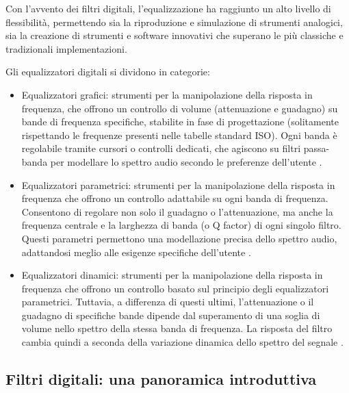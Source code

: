 \documentclass[12pt]{report}
\begin{document}
Con l’avvento dei filtri digitali, l’equalizzazione ha raggiunto un alto livello di flessibilità, permettendo sia la riproduzione e simulazione di strumenti analogici, sia la creazione di strumenti e software innovativi che superano le
più classiche e tradizionali implementazioni.

Gli equalizzatori digitali si dividono in categorie:
\begin{itemize}
    \item Equalizzatori grafici: strumenti per la manipolazione della risposta in frequenza, che offrono un controllo di volume (attenuazione e guadagno) su bande di frequenza specifiche, stabilite in fase di progettazione (solitamente rispettando le frequenze presenti nelle tabelle standard ISO). Ogni banda è regolabile tramite cursori o controlli dedicati, che agiscono su filtri passa-banda per modellare lo spettro audio secondo le preferenze dell'utente \parencite{liski2017quest}.
    \item Equalizzatori parametrici: strumenti per la manipolazione della risposta in frequenza che offrono un controllo adattabile su ogni banda di frequenza. Consentono di regolare non solo il guadagno o l'attenuazione, ma anche la frequenza centrale e la larghezza di banda (o Q factor) di ogni singolo filtro. Questi parametri permettono una modellazione precisa dello spettro audio, adattandosi meglio alle esigenze specifiche dell'utente \parencite{massenburg1972parametric}.
    \item Equalizzatori dinamici: strumenti per la manipolazione della risposta in frequenza che offrono un controllo basato sul principio degli equalizzatori parametrici. Tuttavia, a differenza di questi ultimi, l'attenuazione o il guadagno di specifiche bande dipende dal superamento di una soglia di volume nello spettro della stessa banda di frequenza. La risposta del filtro cambia quindi a seconda della variazione dinamica dello spettro del segnale \parencite{martignon2023dynamic}.
\end{itemize}

\subsection{Filtri digitali: una panoramica introduttiva}
\end{document}
